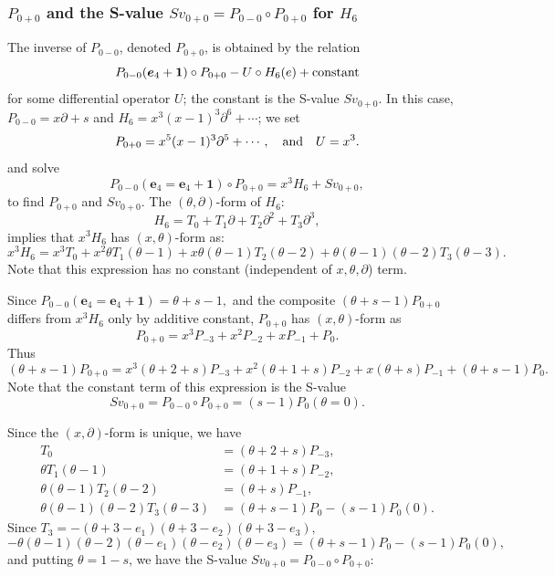 \documentclass[a4paper,12pt]{article}
\theoremstyle{definition}
\theoremstyle{remark}
\numberwithin{equation}{section} %
\begin{document}
\subsubsection{$P_{0+0}$ and the S-value $Sv_{0+0}=P_{0-0}\circ P_{0+0}$ for $H_6$}
The inverse of $P_{0-0}$, denoted $P_{0+0}$, is obtained by the relation
$$P_{0-0}({\bm e}_4+{\bf 1})\circ P_{0+0}-U\circ H_6(e)+{\rm constant}$$
 for some differential operator $U$; the constant is the S-value $Sv_{0+0}$. 
In this case, $P_{0-0}=x\partial+s$ and $H_6=x^3(x-1)^3\partial^6+\cdots$; we set
\[P_{0+0}=x^5(x-1)^3\partial^5+\cdots,\quad {\rm and}\quad U=x^3. \]
and solve
\begin{equation}\label{inverse_and_S-value}
P_{0-0}({\bm e}_4={\bm e}_4+{\bm 1})\circ P_{0+0}=x^3H_6+Sv_{0+0},
\end{equation}
to find $P_{0+0}$ and $Sv_{0+0}$. 
The $(\theta,\partial)$-form of $H_6$:
$$H_6=T_0+T_1\partial+T_2\partial^2+T_3\partial^3,$$
implies that $x^3H_6$ has $(x,\theta)$-form as:
$$x^3H_6=x^3T_0+x^2\theta T_1(\theta-1)+x\theta(\theta-1)T_2(\theta-2)+\theta(\theta-1)(\theta-2)T_3(\theta-3).$$
Note that this expression has no constant (independent of $x,\theta,\partial$) term.
\par\noindent
Since $P_{0-0}({\bm e}_4={\bm e}_4+{\bm 1})=\theta+s-1,$ and the composite $(\theta+s-1)P_{0+0}$ differs from $x^3H_6$ only by additive constant, $P_{0+0}$ has $(x,\theta)$-form as
$$P_{0+0}=x^3P_{-3}+x^2P_{-2}+xP_{-1}+P_0.$$
Thus
$$(\theta+s-1)P_{0+0}=x^3(\theta+2+s)P_{-3}+x^2(\theta+1+s)P_{-2}+x(\theta+s)P_{-1}+(\theta+s-1)P_0.$$
Note that the constant term of this expression is the S-value
$$Sv_{0+0}=P_{0-0}\circ P_{0+0}=(s-1)P_0(\theta=0).$$
\par\noindent
Since the $(x,\partial)$-form is unique, we have
$$\begin{array}{ll}T_0&=(\theta+2+s)P_{-3},\\
  \theta T_1(\theta-1)&=(\theta+1+s)P_{-2},\\
  \theta(\theta-1)T_2(\theta-2)&=(\theta+s)P_{-1},\\
  \theta(\theta-1)(\theta-2)T_3(\theta-3)&=(\theta+s-1)P_0-(s-1)P_0(0).\end{array}$$
Since  $T_3=-(\theta+3-e_1)(\theta+3-e_2)(\theta+3-e_3),$ 
$$-\theta(\theta-1)(\theta-2)(\theta-e_1)(\theta-e_2)(\theta-e_3)=(\theta+s-1)P_0-(s-1)P_0(0),$$
and putting $\theta=1-s$, we have the S-value $Sv_{0+0}=P_{0-0}\circ P_{0+0}$:
\end{document}
